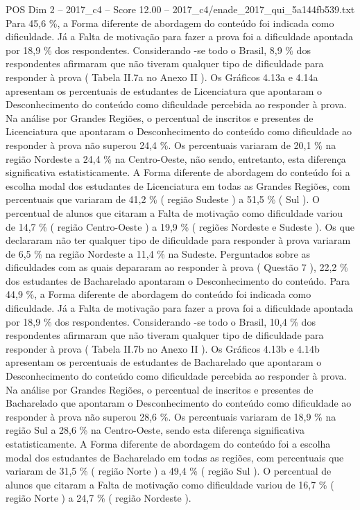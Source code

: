 \begin{textsample}{POS Dim 2 – 2017\_c4 – Score 12.00 – 2017\_c4/enade\_2017\_qui\_5a144fb539.txt}
Para 45,6 \%, a Forma diferente de abordagem do conteúdo foi indicada como dificuldade.
Já a Falta de motivação para fazer a prova foi a dificuldade apontada por 18,9 \% dos respondentes.
Considerando -se todo o Brasil, 8,9 \% dos respondentes afirmaram que não tiveram qualquer tipo de dificuldade para responder à prova ( Tabela II.7a no Anexo II ).
Os Gráficos 4.13a e 4.14a apresentam os percentuais de estudantes de Licenciatura que apontaram o Desconhecimento do conteúdo como dificuldade percebida ao responder à prova.
Na análise por Grandes Regiões, o percentual de inscritos e presentes de Licenciatura que apontaram o Desconhecimento do conteúdo como dificuldade ao responder à prova não superou 24,4 \%.
Os percentuais variaram de 20,1 \% na região Nordeste a 24,4 \% na Centro-Oeste, não sendo, entretanto, esta diferença significativa estatisticamente.
A Forma diferente de abordagem do conteúdo foi a escolha modal dos estudantes de Licenciatura em todas as Grandes Regiões, com percentuais que variaram de 41,2 \% ( região Sudeste ) a 51,5 \% ( Sul ).
O percentual de alunos que citaram a Falta de motivação como dificuldade variou de 14,7 \% ( região Centro-Oeste ) a 19,9 \% ( regiões Nordeste e Sudeste ).
Os que declararam não ter qualquer tipo de dificuldade para responder à prova variaram de 6,5 \% na região Nordeste a 11,4 \% na Sudeste.
Perguntados sobre as dificuldades com as quais depararam ao responder à prova ( Questão 7 ), 22,2 \% dos estudantes de Bacharelado apontaram o Desconhecimento do conteúdo.
Para 44,9 \%, a Forma diferente de abordagem do conteúdo foi indicada como dificuldade.
Já a Falta de motivação para fazer a prova foi a dificuldade apontada por 18,9 \% dos respondentes.
Considerando -se todo o Brasil, 10,4 \% dos respondentes afirmaram que não tiveram qualquer tipo de dificuldade para responder à prova ( Tabela II.7b no Anexo II ).
Os Gráficos 4.13b e 4.14b apresentam os percentuais de estudantes de Bacharelado que apontaram o Desconhecimento do conteúdo como dificuldade percebida ao responder à prova.
Na análise por Grandes Regiões, o percentual de inscritos e presentes de Bacharelado que apontaram o Desconhecimento do conteúdo como dificuldade ao responder à prova não superou 28,6 \%.
Os percentuais variaram de 18,9 \% na região Sul a 28,6 \% na Centro-Oeste, sendo esta diferença significativa estatisticamente.
A Forma diferente de abordagem do conteúdo foi a escolha modal dos estudantes de Bacharelado em todas as regiões, com percentuais que variaram de 31,5 \% ( região Norte ) a 49,4 \% ( região Sul ).
O percentual de alunos que citaram a Falta de motivação como dificuldade variou de 16,7 \% ( região Norte ) a 24,7 \% ( região Nordeste ).

\end{textsample}
